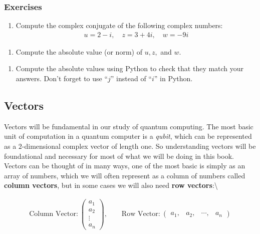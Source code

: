 \documentclass[11pt]{article}
\providecommand{\tightlist}{%
      \setlength{\itemsep}{0pt}\setlength{\parskip}{0pt}}
\begin{document}
    \hypertarget{exercises}{%
\subsubsection{Exercises}\label{exercises}}

    \begin{enumerate}
\def\labelenumi{\arabic{enumi}.}
\tightlist
\item
  Compute the complex conjugate of the following complex numbers:
  \begin{align}
  u = 2-i, \quad z = 3+4i, \quad w = -9i
  \end{align}
\end{enumerate}

    \begin{enumerate}
\def\labelenumi{\arabic{enumi}.}
\setcounter{enumi}{1}
\tightlist
\item
  Compute the absolute value (or norm) of \(u, z,\) and \(w\).
\end{enumerate}

    \begin{enumerate}
\def\labelenumi{\arabic{enumi}.}
\setcounter{enumi}{2}
\tightlist
\item
  Compute the absolute values using Python to check that they match your
  answers. Don't forget to use ``\(j\)'' instead of ``\(i\)'' in Python.
\end{enumerate}

    \hypertarget{vectors}{%
\subsection{Vectors}\label{vectors}}

Vectors will be fundamental in our study of quantum computing. The most
basic unit of computation in a quantum computer is a \emph{qubit}, which
can be represented as a \(2\)-dimensional complex vector of length one.
So understanding vectors will be foundational and necessary for most of
what we will be doing in this book. Vectors can be thought of in many
ways, one of the most basic is simply as an array of numbers, which we
will often represent as a column of numbers called
\textbf{column vectors}, but in some cases we will also need
\textbf{row vectors}:\textbackslash{}

\begin{align} \text{Column Vector:} \ \begin{pmatrix}
a_1 \\ a_2 \\ \vdots \\ a_n
\end{pmatrix}, \quad \quad \text{Row Vector:} \ \begin{pmatrix}
a_1, & a_2, & \cdots, & a_n
\end{pmatrix} \end{align}
\end{document}
